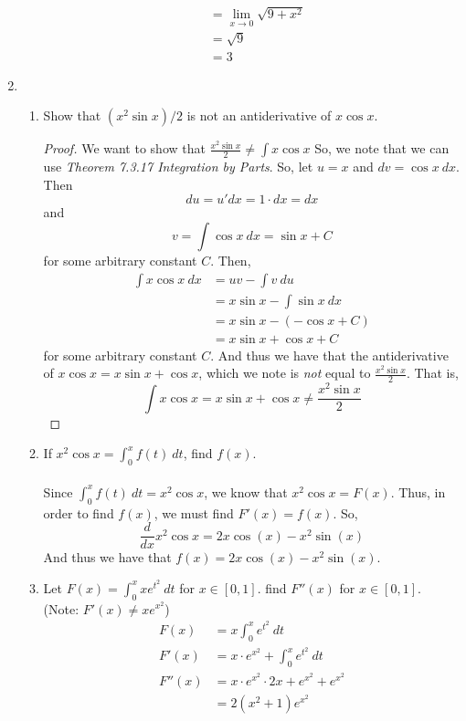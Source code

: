 \documentclass[12pt,letterpaper]{article}
\newcommand{\limx}[2]{\displaystyle\lim\limits_{#1 \to #2}}
\theoremstyle{case}
\theoremstyle{definition}
\begin{document}
\begin{enumerate}
\begin{enumerate}
\begin{align*}
				&= \limx{x}{0} \sqrt{9+x^2} \\
				&= \sqrt{9} \\
				&= 3
			\end{align*}
		\end{enumerate}
		\item 
		\begin{enumerate}
			\item Show that $(x^2\sin x) /2$ is not an antiderivative of $x \cos x$.
			\begin{proof}
				We want to show that $\frac{x^2\sin x}{2} \neq \int x\cos x $ So, we note that we can use \textit{Theorem 7.3.17 Integration by Parts}. So, let $u=x$ and $dv=\cos x\ dx$. Then
				\[du = u'dx=1\cdot dx = dx\]
				and
				\[v=\int \cos x\ dx = \sin x + C\]
				for some arbitrary constant $C$. Then,
				\begin{align*}
					\int x \cos x\ dx &= uv - \int v\ du \\
					&= x\sin x - \int \sin x\ dx \\
					&= x\sin x - (-\cos x + C) \\
					&= x\sin x + \cos x + C
				\end{align*}
				for some arbitrary constant $C$. And thus we have that the antiderivative of $x \cos x=x\sin x +\cos x$, which we note is \textit{not} equal to $\frac{x^2\sin x}{2}$. That is,
				\[\int x \cos x = x \sin x +\cos x \neq \frac{x^2\sin x}{2}\]
			\end{proof}
			\item If $x^2 \cos x= \displaystyle\int_{0}^{x} f(t)\ dt$, find $f(x)$.
			\\\\Since $\displaystyle\int_{0}^{x} f(t)\ dt = x^2\cos x$, we know that $x^2\cos x=F(x)$. Thus, in order to find $f(x)$, we must find $F'(x)=f(x)$. So,
			\[\frac{d}{dx} x^2\cos x = 2x\cos(x)-x^2\sin(x)\]
			And thus we have that $f(x)=2x\cos(x)-x^2\sin(x)$.\\
			\item Let $F(x)=\displaystyle\int_{0}^{x} xe^{t^2}\ dt$ for $x \in [0,1]$. find $F''(x)$ for $x \in [0,1]$. (Note: $F'(x) \neq xe^{x^2}$) 
			\begin{align*}
				F(x) &= x \int_{0}^{x} e^{t^2}\ dt \\
				F'(x) &= x \cdot e^{x^2} + \int_{0}^{x} e^{t^2}\ dt \\
				F''(x) &= x \cdot e^{x^2} \cdot 2x + e^{x^2}+e^{x^2} \\
				&= 2(x^2+1)e^{x^2}
			\end{align*}

\end{enumerate}
\end{enumerate}
\end{document}
